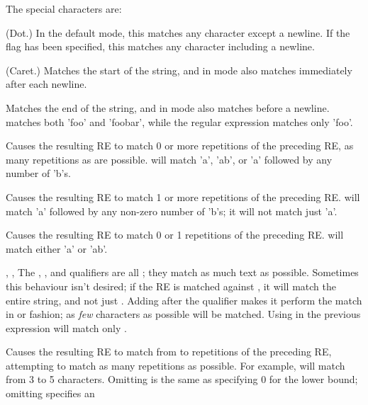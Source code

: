 The special characters are:
\newcommand{\MyLeftMargin}{0.7in}
\newcommand{\MyLabelWidth}{0.65in}
\begin{list}{}{\leftmargin \MyLeftMargin \labelwidth \MyLabelWidth}
\item[\character{.}] (Dot.)  In the default mode, this matches any
character except a newline.  If the  flag has been
specified, this matches any character including a newline.
%
\item[\character{\^}] (Caret.)  Matches the start of the string, and in
 mode also matches immediately after each newline.
%
\item[\character{\$}] Matches the end of the string, and in
 mode also matches before a newline.
 matches both 'foo' and 'foobar', while the regular
expression  matches only 'foo'.
%
\item[\character{*}] Causes the resulting RE to
match 0 or more repetitions of the preceding RE, as many repetitions
as are possible.   will
match 'a', 'ab', or 'a' followed by any number of 'b's.
%
\item[\character{+}] Causes the
resulting RE to match 1 or more repetitions of the preceding RE.
 will match 'a' followed by any non-zero number of 'b's; it
will not match just 'a'.
%
\item[\character{?}] Causes the resulting RE to
match 0 or 1 repetitions of the preceding RE.   will
match either 'a' or 'ab'.
\item[\code{*?}, \code{+?}, \code{??}] The \character{*}, \character{+}, and
 qualifiers are all ; they match as much text as
possible.  Sometimes this behaviour isn't desired; if the RE
 is matched against , it will match the
entire string, and not just .
Adding  after the qualifier makes it perform the match in
 or  fashion; as \emph{few} characters as
possible will be matched.  Using  in the previous
expression will match only .
%
\item[\code{\{\var{m},\var{n}\}}] Causes the resulting RE to match from
 to  repetitions of the preceding RE, attempting to
match as many repetitions as possible.   For example,   
will match from 3 to 5  characters.  Omitting  is the same
as specifying 0 for the lower bound; omitting  specifies an

\end{list}
